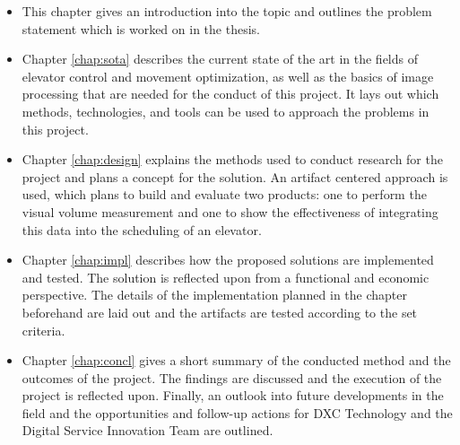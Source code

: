 \begin{itemize}
    \item This chapter gives an introduction into the topic and outlines the problem statement which is worked on in the thesis.
    \item Chapter \ref{chap:sota} describes the current state of the art in the fields of elevator control and movement optimization, as well as the basics of image processing that are needed for the conduct of this project. It lays out which methods, technologies, and tools can be used to approach the problems in this project.
    \item Chapter \ref{chap:design} explains the methods used to conduct research for the project and plans a concept for the solution. An artifact centered approach is used, which plans to build and evaluate two products: one to perform the visual volume measurement and one to show the effectiveness of integrating this data into the scheduling of an elevator.
    \item Chapter \ref{chap:impl} describes how the proposed solutions are implemented and tested. The solution is reflected upon from a functional and economic perspective. The details of the implementation planned in the chapter beforehand are laid out and the artifacts are tested according to the set criteria.
    \item Chapter \ref{chap:concl} gives a short summary of the conducted method and the outcomes of the project. The findings are discussed and the execution of the project is reflected upon. Finally, an outlook into future developments in the field and the opportunities and follow-up actions for DXC Technology and the Digital Service Innovation Team are outlined.
\end{itemize}